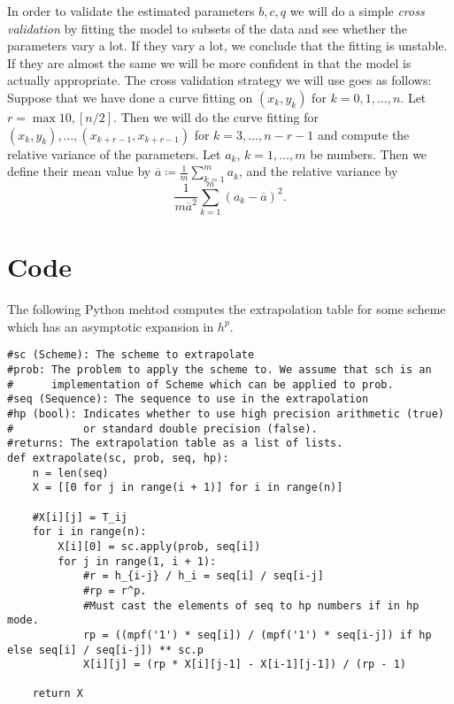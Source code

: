 In order to validate the estimated parameters \(b,c,q\) we will do a simple {\it cross validation} by fitting the model to subsets of the data and see whether the parameters vary a lot. If they vary a lot, we conclude that the fitting is unstable. If they are almost the same we will be more confident in that the model is actually appropriate. The cross validation strategy we will use goes as follows: Suppose that we have done a curve fitting on \((x_k,y_k)\) for \(k=0,1,\ldots,n\). Let \(r = \max{10, [n/2]}\). Then we will do the curve fitting for \((x_k,y_k), \ldots, (x_{k+r-1},x_{k+r-1})\) for \(k=3,\ldots,n-r-1\) and compute the relative variance of the parameters. Let \(a_k\), \(k=1,\ldots, m\) be numbers. Then we define their mean value by \(\overline{a} \coloneqq \frac{1}{m}\sum_{k=1}^m a_k\), and the relative variance by 
\[
\frac{1}{m\overline{a}^2}\sum_{k=1}^m (a_k - \overline{a})^2. 
\]

\section{Code}

The following Python mehtod computes the extrapolation table for some scheme which has an asymptotic expansion in \(h^p\).

\begin{verbatim}
#sc (Scheme): The scheme to extrapolate	
#prob: The problem to apply the scheme to. We assume that sch is an 
#      implementation of Scheme which can be applied to prob.
#seq (Sequence): The sequence to use in the extrapolation
#hp (bool): Indicates whether to use high precision arithmetic (true) 
#           or standard double precision (false).
#returns: The extrapolation table as a list of lists. 
def extrapolate(sc, prob, seq, hp):
	n = len(seq)
	X = [[0 for j in range(i + 1)] for i in range(n)]

	#X[i][j] = T_ij
	for i in range(n):
		X[i][0] = sc.apply(prob, seq[i])
		for j in range(1, i + 1):
			#r = h_{i-j} / h_i = seq[i] / seq[i-j]
			#rp = r^p.
			#Must cast the elements of seq to hp numbers if in hp mode.
			rp = ((mpf('1') * seq[i]) / (mpf('1') * seq[i-j]) if hp else seq[i] / seq[i-j]) ** sc.p
			X[i][j] = (rp * X[i][j-1] - X[i-1][j-1]) / (rp - 1)

	return X
\end{verbatim}
